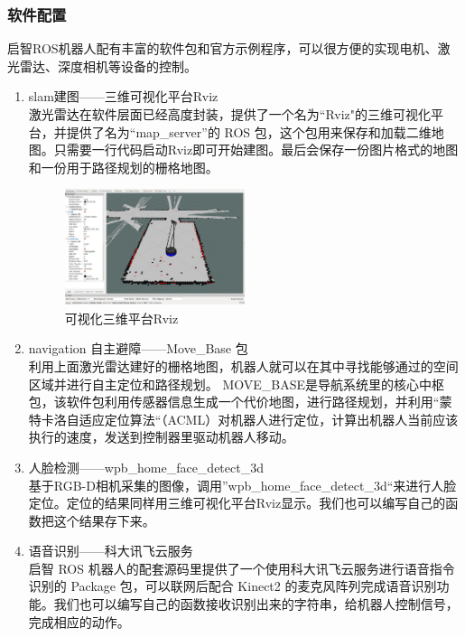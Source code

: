 \documentclass[11pt]{article}
\begin{document}
\subsubsection{软件配置}
启智ROS机器人配有丰富的软件包和官方示例程序，可以很方便的实现电机、激光雷达、深度相机等设备的控制。
\begin{enumerate}[$\bullet$]
    \item slam建图------三维可视化平台Rviz\\
    激光雷达在软件层面已经高度封装，提供了一个名为``Rviz"的三维可视化平台，并提供了名为``map\_server''的
ROS
包，这个包用来保存和加载二维地图。只需要一行代码启动Rviz即可开始建图。最后会保存一份图片格式的地图和一份用于路径规划的栅格地图。
\begin{figure}[H] %
    \centering %
    \includegraphics[width=0.5\textwidth]{8} %
    \caption{可视化三维平台Rviz}
\end{figure}
    \item navigation 自主避障------Move\_Base 包\\
    利用上面激光雷达建好的栅格地图，机器人就可以在其中寻找能够通过的空间区域并进行自主定位和路径规划。
MOVE\_BASE是导航系统里的核心中枢包，该软件包利用传感器信息生成一个代价地图，进行路径规划，并利用``蒙特卡洛自适应定位算法“（ACML）对机器人进行定位，计算出机器人当前应该执行的速度，发送到控制器里驱动机器人移动。
    \item 人脸检测------wpb\_home\_face\_detect\_3d\\
    基于RGB-D相机采集的图像，调用''wpb\_home\_face\_detect\_3d``来进行人脸定位。定位的结果同样用三维可视化平台Rviz显示。我们也可以编写自己的函数把这个结果存下来。
    \item 语音识别------科大讯飞云服务\\
    启智 ROS
机器人的配套源码里提供了一个使用科大讯飞云服务进行语音指令识别的
Package 包，可以联网后配合 Kinect2
的麦克风阵列完成语音识别功能。我们也可以编写自己的函数接收识别出来的字符串，给机器人控制信号，完成相应的动作。
\end{enumerate}
\end{document}
